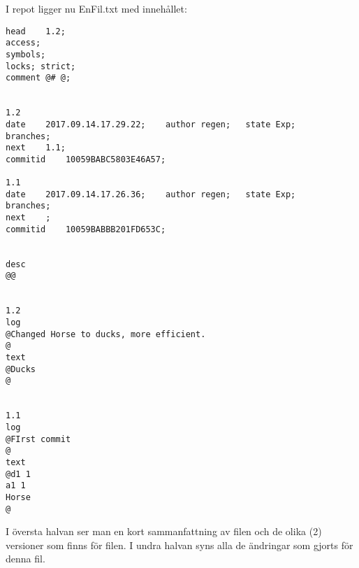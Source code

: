 \documentclass[11pt]{article}
\begin{document}
I repot ligger nu EnFil.txt med innehållet: 
\begin{verbatim}
head	1.2;
access;
symbols;
locks; strict;
comment	@# @;


1.2
date	2017.09.14.17.29.22;	author regen;	state Exp;
branches;
next	1.1;
commitid	10059BABC5803E46A57;

1.1
date	2017.09.14.17.26.36;	author regen;	state Exp;
branches;
next	;
commitid	10059BABBB201FD653C;


desc
@@


1.2
log
@Changed Horse to ducks, more efficient.
@
text
@Ducks
@


1.1
log
@FIrst commit
@
text
@d1 1
a1 1
Horse
@

\end{verbatim}

I översta halvan ser man en kort sammanfattning av filen och de olika (2) versioner som finns för filen. I undra halvan syns alla de ändringar som gjorts för denna fil. 

\newpage
\end{document}
